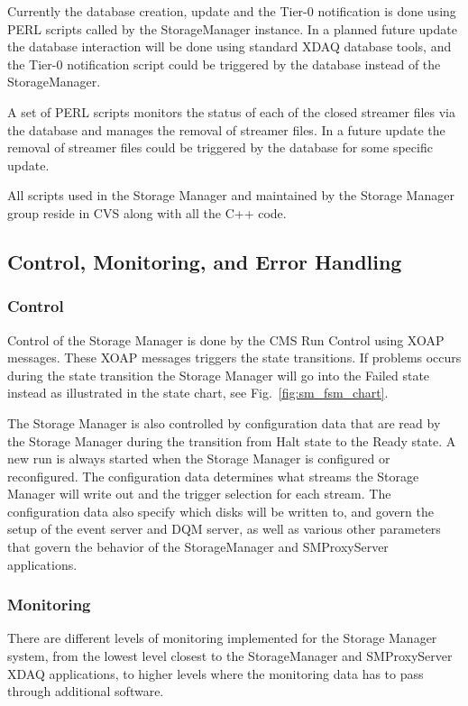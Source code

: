 Currently the database creation, update and the Tier-0 notification is done using PERL
scripts called by the StorageManager instance. In a planned future update the database 
interaction will be done using standard XDAQ database tools, and the Tier-0 notification
script could be triggered by the database instead of the StorageManager.

A set of PERL scripts monitors the status of each of the closed streamer files via
the database and manages the removal of streamer files. In a future update the removal
of streamer files could be triggered by the database for some specific update.

All scripts used in the Storage Manager and maintained by the Storage Manager group
reside in CVS along with all the C++ code.


\subsection{Control, Monitoring, and Error Handling}

\subsubsection{Control}

Control of the Storage Manager is done by the CMS Run Control using XOAP messages.
These XOAP messages triggers the state transitions. If problems occurs during the
state transition the Storage Manager will go into the Failed state instead as
illustrated in the state chart, see Fig.~\ref{fig:sm_fsm_chart}. 

The Storage Manager
is also controlled by configuration data that are read by the Storage Manager 
during the transition from Halt state to the Ready state. A new run is always
started when the Storage Manager is configured or reconfigured. The configuration
data determines what streams the Storage Manager will write out and the
trigger selection for each stream. The configuration data also specify which
disks will be written to, and govern the setup of the event server and DQM
server, as well as various other parameters that govern the behavior of the 
StorageManager and SMProxyServer applications.


\subsubsection{Monitoring}

There are different levels of monitoring implemented for the Storage Manager
system, from the lowest level closest to the StorageManager and
SMProxyServer XDAQ applications, to higher levels where the monitoring
data has to pass through additional software.

